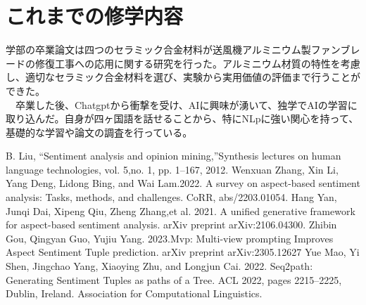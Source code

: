 \documentclass[a4j,10pt, twocolumn]{jarticle} \usepackage[dvipdfmx]{graphicx} \usepackage{amssymb} \usepackage{amsmath}
\begin{document}
\section{これまでの修学内容}
学部の卒業論文は四つのセラミック合金材料が送風機アルミニウム製ファンブレードの修復工事への応用に関する研究を行った。アルミニウム材質の特性を考慮し、適切なセラミック合金材料を選び、実験から実用価値の評価まで行うことができた。\\
　卒業した後、Chatgptから衝撃を受け、AIに興味が湧いて、独学でAIの学習に取り込んだ。自身が四ヶ国語を話せることから、特にNLpに強い関心を持って、基礎的な学習や論文の調査を行っている。

\begin{thebibliography}{5}
  B. Liu, “Sentiment analysis and opinion mining,”Synthesis lectures on human language technologies, vol. 5,no. 1, pp. 1–167, 2012.
  Wenxuan Zhang, Xin Li, Yang Deng, Lidong Bing, and Wai Lam.2022. A survey on aspect-based sentiment analysis: Tasks, methods, and challenges. CoRR,
abs/2203.01054.
Hang Yan, Junqi Dai, Xipeng Qiu, Zheng Zhang,et al. 2021. A unified generative framework for aspect-based sentiment analysis. arXiv preprint
arXiv:2106.04300.
Zhibin Gou, Qingyan Guo, Yujiu Yang. 2023.Mvp: Multi-view prompting Improves Aspect Sentiment Tuple prediction. arXiv
preprint arXiv:2305.12627
Yue Mao, Yi Shen, Jingchao Yang, Xiaoying Zhu, and Longjun Cai. 2022. Seq2path: Generating Sentiment Tuples as paths of a Tree. ACL 2022, pages 2215–2225, Dublin, Ireland. Association for Computational Linguistics.
\end{thebibliography}
\end{document}
